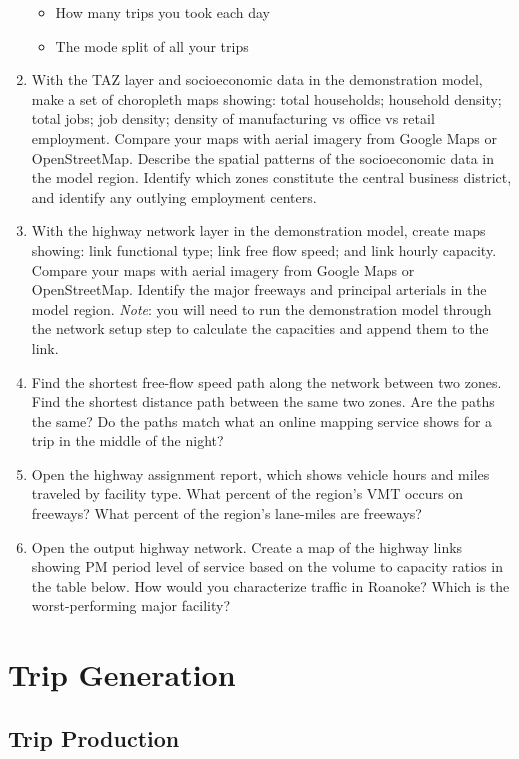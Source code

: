 \documentclass[]{book}
\providecommand{\tightlist}{%
  \setlength{\itemsep}{0pt}\setlength{\parskip}{0pt}}
\begin{document}
\begin{enumerate}
  \begin{itemize}
  \tightlist
  \item
    How many trips you took each day
  \item
    The mode split of all your trips
  \end{itemize}
\item
  With the TAZ layer and socioeconomic data in the demonstration model, make a
  set of choropleth maps showing: total households; household density; total jobs;
  job density; density of manufacturing vs office vs retail employment. Compare
  your maps with aerial imagery from Google Maps or OpenStreetMap. Describe the
  spatial patterns of the socioeconomic data in the model region. Identify which
  zones constitute the central business district, and identify any outlying
  employment centers.
\item
  With the highway network layer in the demonstration model, create maps
  showing: link functional type; link free flow speed; and link hourly capacity.
  Compare your maps with aerial imagery from Google Maps or OpenStreetMap.
  Identify the major freeways and principal arterials in the model region. \emph{Note}:
  you will need to run the demonstration model through the network setup step to
  calculate the capacities and append them to the link.
\item
  Find the shortest free-flow speed path along the network between two zones.
  Find the shortest distance path between the same two zones. Are the paths the
  same? Do the paths match what an online mapping service shows for a trip in the
  middle of the night?
\item
  Open the highway assignment report, which shows vehicle hours and miles
  traveled by facility type. What percent of the region's VMT occurs on freeways?
  What percent of the region's lane-miles are freeways?
\item
  Open the output highway network. Create a map of the
  highway links showing PM period level of service based on the volume to capacity
  ratios in the table below. How would you characterize traffic in Roanoke? Which
  is the worst-performing major facility?
\end{enumerate}

\hypertarget{chap-tripgen}{%
\chapter{Trip Generation}\label{chap-tripgen}}

\hypertarget{trip-production}{%
\section{Trip Production}\label{trip-production}}
\end{document}
